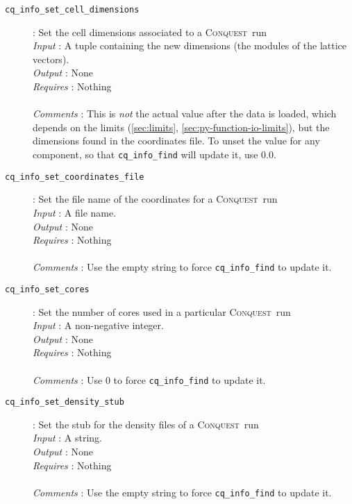 \documentclass[a4paper,notitlepage,11pt]{article}
\def\CQ{\textsc{Conquest}}
\begin{document}
\begin{description}
\item[\texttt{cq\_info\_set\_cell\_dimensions}]: Set the cell dimensions associated to a \CQ\ run\\
  \emph{Input} : A tuple containing the new dimensions (the modules of the lattice vectors).\\
  \emph{Output} : None\\
  \emph{Requires} : Nothing\\
  \\
  \emph{Comments} : This is \emph{not} the actual value after the data is loaded, which depends on the limits (\ref{sec:limits}, 
  \ref{sec:py-function-io-limits}), but the dimensions found in the coordinates file.
  To unset the value for any component, so that \texttt{cq\_info\_find} will update it, use 0.0.\\
\end{description}

\begin{description}
\item[\texttt{cq\_info\_set\_coordinates\_file}]: Set the file name of the coordinates for a \CQ\ run\\
  \emph{Input} : A file name.\\
  \emph{Output} : None\\
  \emph{Requires} : Nothing\\
  \\
  \emph{Comments} : Use the empty string to force \texttt{cq\_info\_find} to update it.
\end{description}

\begin{description}
\item[\texttt{cq\_info\_set\_cores}]: Set the number of cores used in a particular \CQ\ run\\
  \emph{Input} : A non-negative integer.\\
  \emph{Output} : None\\
  \emph{Requires} : Nothing\\
  \\
  \emph{Comments} : Use 0 to force \texttt{cq\_info\_find} to update it.
\end{description}

\begin{description}
\item[\texttt{cq\_info\_set\_density\_stub}]: Set the stub for the density files of a \CQ\ run\\
  \emph{Input} : A string.\\
  \emph{Output} : None\\
  \emph{Requires} : Nothing\\
  \\
  \emph{Comments} : Use the empty string to force \texttt{cq\_info\_find} to update it.
\end{description}
\end{document}
